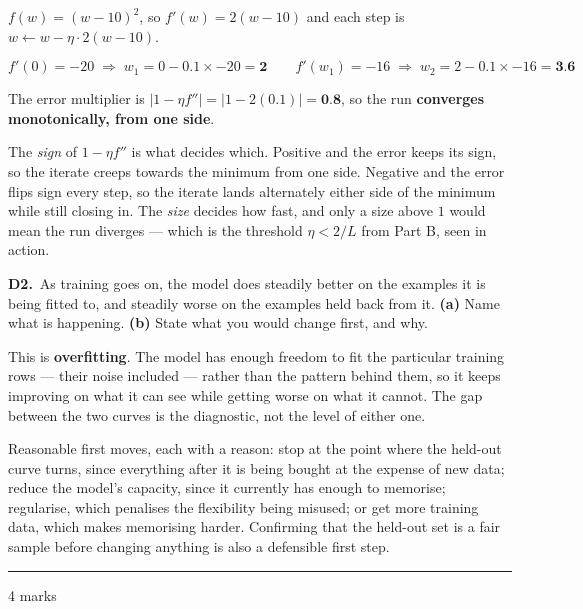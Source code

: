 \documentclass[10pt,a4paper]{article}
\newcommand{\parthead}[2]{\vspace{2pt}\noindent\rule{\linewidth}{0.4pt}\par\vspace{2pt}%
  \noindent{\bfseries Part #1}\hfill{\small #2}\par\vspace{1pt}}
\newcommand{\sol}[1]{\textbf{#1}}
\begin{document}
$f(w) = (w-10)^2$, so $f'(w) = 2(w-10)$ and each step is $w \leftarrow w - \eta \cdot 2(w-10)$.

\[ f'(0) = -20 \;\Rightarrow\; w_1 = 0 - 0.1 \times -20 = \sol{2} \qquad f'(w_1) = -16 \;\Rightarrow\; w_2 = 2 - 0.1 \times -16 = \sol{3.6} \]

The error multiplier is $\lvert 1 - \eta f'' \rvert = \lvert 1 - 2(0.1) \rvert = \sol{0.8}$, so the run \sol{converges monotonically, from one side}.

\vspace{2pt}

The \emph{sign} of $1 - \eta f''$ is what decides which. Positive and the error keeps its sign, so the iterate creeps towards the minimum from one side. Negative and the error flips sign every step, so the iterate lands alternately either side of the minimum while still closing in. The \emph{size} decides how fast, and only a size above $1$ would mean the run diverges --- which is the threshold $\eta < 2/L$ from Part B, seen in action.

\vspace{6pt}

\textbf{D2.}\ As training goes on, the model does steadily better on the examples it is being fitted to, and steadily worse on the examples held back from it. \textbf{(a)} Name what is happening. \textbf{(b)} State what you would change first, and why.

\vspace{2pt}

This is \textbf{overfitting}. The model has enough freedom to fit the particular training rows --- their noise included --- rather than the pattern behind them, so it keeps improving on what it can see while getting worse on what it cannot. The gap between the two curves is the diagnostic, not the level of either one.\par\vspace{1mm}Reasonable first moves, each with a reason: stop at the point where the held-out curve turns, since everything after it is being bought at the expense of new data; reduce the model's capacity, since it currently has enough to memorise; regularise, which penalises the flexibility being misused; or get more training data, which makes memorising harder. Confirming that the held-out set is a fair sample before changing anything is also a defensible first step.

\newpage

\parthead{E --- Reasoning}{4 marks}
\end{document}

